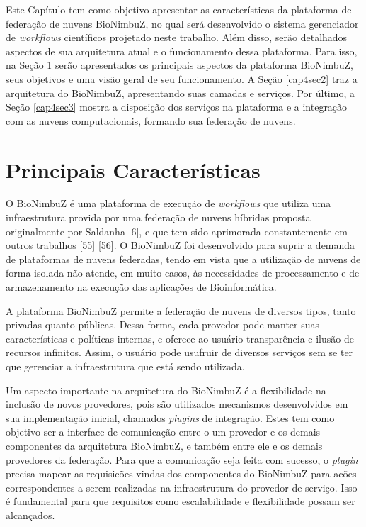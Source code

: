 Este Capítulo tem como objetivo apresentar as características da plataforma de federação de nuvens BioNimbuZ, no qual será desenvolvido o sistema gerenciador de \textit{workflows} científicos projetado neste trabalho. Além disso, serão detalhados aspectos de sua arquitetura atual e o funcionamento dessa plataforma. Para isso, na Seção \ref{cap4sec1} serão apresentados os principais aspectos da plataforma BioNimbuZ, seus objetivos e uma visão geral de seu funcionamento. A Seção \ref{cap4sec2} traz a arquitetura do BioNimbuZ, apresentando suas camadas e serviços. Por último, a Seção \ref{cap4sec3} mostra a disposição dos serviços na plataforma e a integração com as nuvens computacionais, formando sua federação de nuvens.

\section{Principais Características} \label{cap4sec1}

O BioNimbuZ é uma plataforma de execução de \textit{workflows} que utiliza uma infraestrutura provida por uma federação de nuvens híbridas proposta originalmente por Saldanha [6], e que tem sido aprimorada constantemente em outros trabalhos [55] [56]. O BioNimbuZ foi desenvolvido para suprir a demanda de plataformas de nuvens federadas, tendo em vista que a utilização de nuvens de forma isolada não atende, em muito casos, às necessidades de processamento e de armazenamento na execução das aplicações de Bioinformática. 

A plataforma BioNimbuZ permite a federação de nuvens de diversos tipos, tanto privadas quanto públicas. Dessa forma, cada provedor pode manter suas características e políticas internas, e oferece ao usuário transparência e ilusão de recursos infinitos. Assim, o usuário pode usufruir de diversos serviços sem se ter que gerenciar a infraestrutura que está sendo utilizada. 

Um aspecto importante na arquitetura do BioNimbuZ é a flexibilidade na inclusão de novos provedores, pois são utilizados mecanismos desenvolvidos em sua implementação inicial, chamados \textit{plugins} de integração. Estes tem como objetivo ser a interface de comunicação entre o um provedor e os demais componentes da arquitetura BioNimbuZ, e também entre ele e os demais provedores da federação. Para que a comunicação seja feita com sucesso, o \textit{plugin} precisa mapear as requisicões vindas dos componentes do BioNimbuZ para acões correspondentes a serem realizadas na infraestrutura do provedor de serviço. Isso é fundamental para que requisitos como escalabilidade e flexibilidade possam ser alcançados. 

